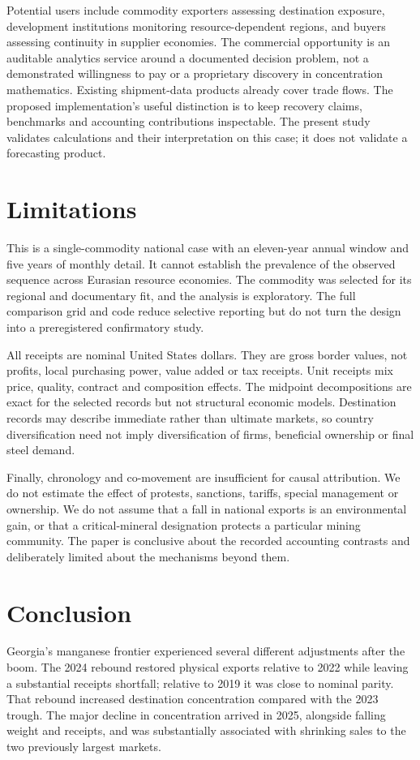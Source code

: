 \documentclass[11pt,a4paper]{article}
\begin{document}
Potential users include commodity exporters assessing destination exposure, development institutions monitoring resource-dependent regions, and buyers assessing continuity in supplier economies. The commercial opportunity is an auditable analytics service around a documented decision problem, not a demonstrated willingness to pay or a proprietary discovery in concentration mathematics. Existing shipment-data products already cover trade flows. The proposed implementation's useful distinction is to keep recovery claims, benchmarks and accounting contributions inspectable. The present study validates calculations and their interpretation on this case; it does not validate a forecasting product.

\section{Limitations}
This is a single-commodity national case with an eleven-year annual window and five years of monthly detail. It cannot establish the prevalence of the observed sequence across Eurasian resource economies. The commodity was selected for its regional and documentary fit, and the analysis is exploratory. The full comparison grid and code reduce selective reporting but do not turn the design into a preregistered confirmatory study.

All receipts are nominal United States dollars. They are gross border values, not profits, local purchasing power, value added or tax receipts. Unit receipts mix price, quality, contract and composition effects. The midpoint decompositions are exact for the selected records but not structural economic models. Destination records may describe immediate rather than ultimate markets, so country diversification need not imply diversification of firms, beneficial ownership or final steel demand.

Finally, chronology and co-movement are insufficient for causal attribution. We do not estimate the effect of protests, sanctions, tariffs, special management or ownership. We do not assume that a fall in national exports is an environmental gain, or that a critical-mineral designation protects a particular mining community. The paper is conclusive about the recorded accounting contrasts and deliberately limited about the mechanisms beyond them.

\section{Conclusion}
Georgia's manganese frontier experienced several different adjustments after the boom. The 2024 rebound restored physical exports relative to 2022 while leaving a substantial receipts shortfall; relative to 2019 it was close to nominal parity. That rebound increased destination concentration compared with the 2023 trough. The major decline in concentration arrived in 2025, alongside falling weight and receipts, and was substantially associated with shrinking sales to the two previously largest markets.
\end{document}
